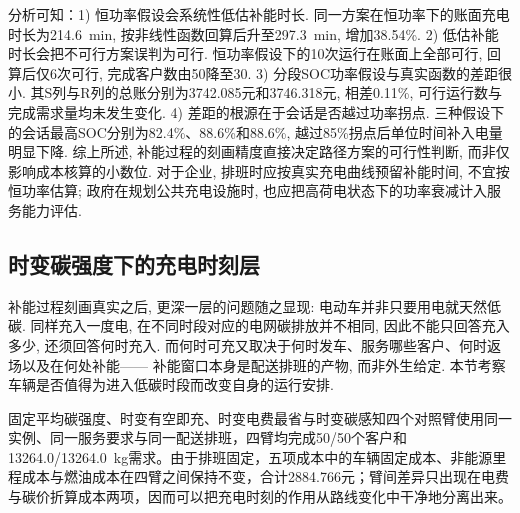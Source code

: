 \documentclass{setp-new}
\begin{document}
分析可知：1) 恒功率假设会系统性低估补能时长. 同一方案在恒功率下的账面充电时长为214.6~min, 按非线性函数回算后升至297.3~min, 增加38.54\%.
2) 低估补能时长会把不可行方案误判为可行. 恒功率假设下的10次运行在账面上全部可行, 回算后仅6次可行, 完成客户数由50降至30.
3) 分段SOC功率假设与真实函数的差距很小. 其S列与R列的总账分别为3742.085元和3746.318元, 相差0.11\%, 可行运行数与完成需求量均未发生变化.
4) 差距的根源在于会话是否越过功率拐点. 三种假设下的会话最高SOC分别为82.4\%、88.6\%和88.6\%, 越过85\%拐点后单位时间补入电量明显下降.
综上所述, 补能过程的刻画精度直接决定路径方案的可行性判断, 而非仅影响成本核算的小数位. 对于企业, 排班时应按真实充电曲线预留补能时间, 不宜按恒功率估算; 政府在规划公共充电设施时, 也应把高荷电状态下的功率衰减计入服务能力评估.

\subsection{时变碳强度下的充电时刻层}

补能过程刻画真实之后, 更深一层的问题随之显现:
电动车并非只要用电就天然低碳.
同样充入一度电, 在不同时段对应的电网碳排放并不相同,
因此不能只回答充入多少, 还须回答何时充入.
而何时可充又取决于何时发车、服务哪些客户、何时返场以及在何处补能——
补能窗口本身是配送排班的产物, 而非外生给定.
本节考察车辆是否值得为进入低碳时段而改变自身的运行安排.

固定平均碳强度、时变有空即充、时变电费最省与时变碳感知四个对照臂使用同一实例、同一服务要求与同一配送排班，四臂均完成50/50个客户和13264.0/13264.0~kg需求。由于排班固定，五项成本中的车辆固定成本、非能源里程成本与燃油成本在四臂之间保持不变，合计2884.766元；臂间差异只出现在电费与碳价折算成本两项，因而可以把充电时刻的作用从路线变化中干净地分离出来。
\end{document}
